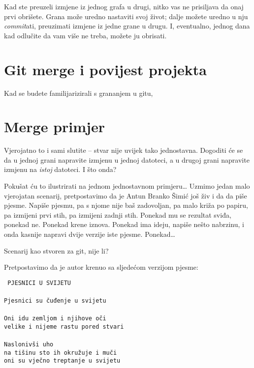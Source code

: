 

Kad ste preuzeli izmjene iz jednog grafa u drugi, nitko vas ne prisiljava da onaj prvi obrišete. 
Grana može uredno nastaviti svoj život; dalje možete uredno u nju \emph{commit}ati, preuzimati izmjene iz jedne grane u drugu.
I, eventualno, jednog dana kad odlučite da vam više ne treba, možete ju obrisati.



\section*{Git merge i povijest projekta}

Kad se budete familijarizirali s grananjem u gitu, 



\section*{Merge primjer}

Vjerojatno to i sami slutite -- stvar nije uvijek tako jednostavna.
Dogoditi će se da u jednoj grani napravite izmjenu u jednoj datoteci, a u drugoj grani napravite izmjenu na \emph{istoj} datoteci.
I što onda?

Pokušat ću to ilustrirati na jednom jednostavnom primjeru\dots
Uzmimo jedan malo vjerojatan scenarij, pretpostavimo da je Antun Branko Šimić još živ i da da piše pjesme.
Napiše pjesmu, pa s njome nije baš zadovoljan, pa malo križa po papiru, pa izmijeni prvi stih, pa izmijeni zadnji stih.
Ponekad mu se rezultat sviđa, ponekad ne.
Ponekad krene iznova.
Ponekad ima ideju, napiše nešto nabrzinu, i onda kasnije napravi dvije verzije iste pjesme.
Ponekad\dots

Scenarij kao stvoren za git, nije li?

Pretpostavimo da je autor krenuo sa sljedećom verzijom pjesme:

\noindent\texttt{%
PJESNICI U SVIJETU\\%
\\%
Pjesnici su čuđenje u svijetu\\%
\\%
Oni idu zemljom i njihove oči\\%
velike i nijeme rastu pored stvari\\%
\\%
Naslonivši uho\\%
na tišinu sto ih okružuje i muči\\%
oni su vječno treptanje u svijetu}

